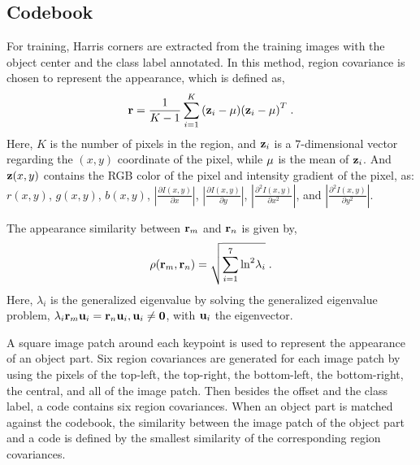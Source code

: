 \documentclass[10pt,twocolumn,letterpaper]{article}
\begin{document}
\subsection{Codebook}
For training, Harris corners are extracted from the training images with the object center and the class label annotated. In this method, region covariance is chosen to represent the appearance, which is defined as,
\[{\bf{r}} = \frac{1}{{K - 1}}\sum\limits_{i = 1}^K {({{\bf{z}}_i} - {\bf{\mu }}){{({{\bf{z}}_i} - {\bf{\mu }})}^T}} \;.\]
Here, $K$ is the number of pixels in the region, and ${{\bf{z}}_i}$ is a $7$-dimensional vector regarding the $(x,y)$ coordinate of the pixel, while ${\bf{\mu }}$ is the mean of ${{\bf{z}}_i}$.   And ${{\bf{z}}}(x,y)$ contains the RGB color of the pixel and intensity gradient of the pixel, as: $r(x,y)$, $g(x,y)$, $b(x,y)$, $|\frac {\partial I(x,y)} {\partial x}|$, $|\frac{\partial I(x,y)}{\partial y}|$, $|\frac{{\partial ^2}I(x,y)}{\partial {x^2}}|$, and $|\frac{{\partial ^2}I(x,y)}{\partial {y^2}}|$.

The appearance similarity between ${\bf{r}}_m$ and ${\bf{r}}_n$ is given by,
\[
\rho ({\bf{r}}_m,{\bf{r}}_n) = \sqrt {\sum\limits_{i = 1}^7 {{{\ln }^2}{\lambda _i}} }\;.
\]
Here, $\lambda _i$ is the generalized eigenvalue by solving the generalized eigenvalue problem, ${\lambda _i}{\bf{r}}_m{{\bf{u}}_i} = {\bf{r}}_n {{\bf{u}}_i},{{\bf{u}}_i} \ne {\bf{0}}$, with ${\bf{u}}_i$ the eigenvector.

A square image patch around each keypoint is used to represent the appearance of an object part. Six region covariances are generated for each image patch by using the pixels of the top-left, the top-right, the bottom-left, the bottom-right, the central, and all of the image patch. Then besides the offset and the class label, a code contains six region covariances. When an object part is matched against the codebook, the similarity between the image patch of the object part and a code is defined by the smallest similarity of the corresponding region covariances.
\end{document}
